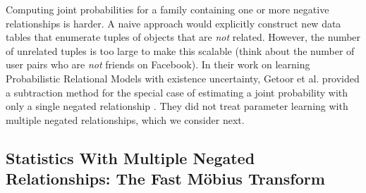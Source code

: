 \documentclass{article}
\begin{document}
Computing joint probabilities for a family containing one or more negative relationships is harder. A naive approach would explicitly construct new data tables that enumerate tuples of objects that are {\em not} related. 
However, the number of unrelated tuples is too large to make this scalable (think about the number of user pairs who are {\em not} friends on Facebook). 
In their work on learning Probabilistic Relational Models with existence  uncertainty, Getoor et al. provided a subtraction method for the special case of estimating a joint probability with only a single negated relationship \cite[Sec.5.8.4.2]{Getoor2007c}. They did not treat parameter learning with multiple negated relationships, which we consider next.

\subsection{Statistics With Multiple Negated Relationships: The Fast M\"obius Transform} 
\end{document}
